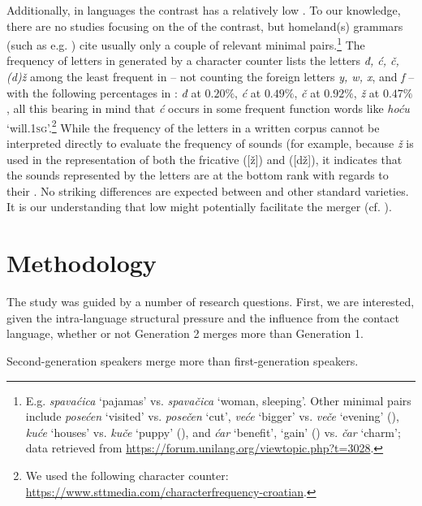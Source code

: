 \documentclass[output=paper,modfonts,newtxmath,hidelinks,]{langscibook}
\begin{document}
Additionally, in  languages the contrast has a relatively low . To our knowledge, there are no studies focusing on the  of the contrast, but homeland(s) grammars (such as e.g. \citealt{Brozovic1991}) cite usually only a couple of relevant minimal pairs.\footnote{E.g. \textit{spavaćica} `pajamas' vs. \textit{spavačica} `woman, sleeping'. Other minimal pairs include \textit{posećen} `visited' vs. \textit{posečen} `cut', \textit{veće} `bigger' vs. \textit{veče} `evening' (), \textit{kuće} `houses' vs. \textit{kuče} `puppy' (), and \textit{ćar} `benefit', `gain' () vs. \textit{čar} `charm'; data retrieved from \url{https://forum.unilang.org/viewtopic.php?t=3028}.} The frequency of letters in  generated by a character counter lists the letters \textit{đ, ć, č, (d)ž} among the least frequent in  – not counting the foreign letters \textit{y, w, x}, and \textit{f} – with the following percentages in : \textit{đ} at $0.20\%$, \textit{ć} at $0.49\%$, \textit{č} at $0.92\%$, \textit{ž} at $0.47\%$, all this bearing in mind that \textit{ć} occurs in some frequent function words like \textit{hoću} `will.\textsc{1sg}’.\footnote{We used the following character counter: \url{https://www.sttmedia.com/characterfrequency-croatian}.} While the frequency of the letters in a written corpus cannot be interpreted directly to evaluate the frequency of sounds (for example, because \textit{ž} is used in the representation of both the fricative ([ž]) and  ([dž]), it indicates that the sounds represented by the letters are at the bottom rank with regards to their . No striking differences are expected between  and other standard varieties. It is our understanding that low  might potentially facilitate the merger (cf. \citealt{Wedel-etal2013}).


\section{Methodology}\label{sec:mihajlovic:4}

The study was guided by a number of research questions. First, we are interested, given the intra-language structural pressure and the influence from the contact language, whether or not Generation 2 merges more than Generation 1.


\begin{exe}
  Second-generation speakers merge more than first-generation   speakers.
\end{exe}
\end{document}
